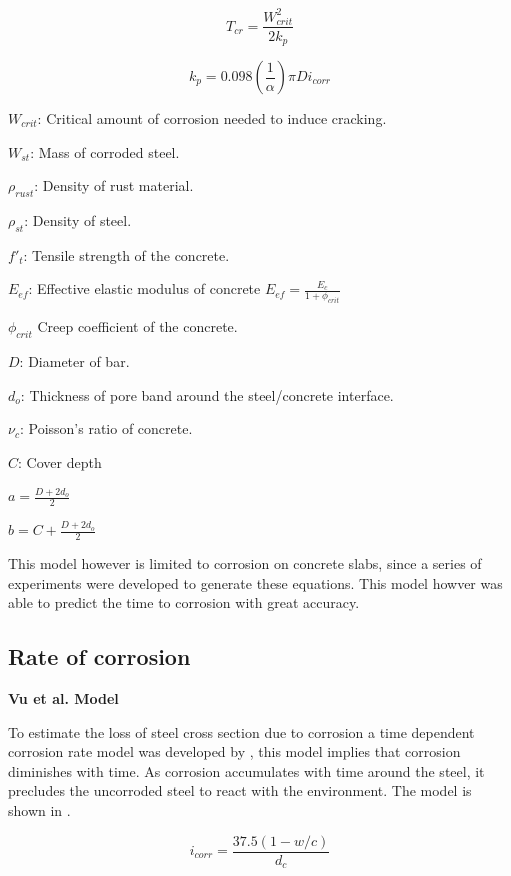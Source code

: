 \begin{equation}
  T_{cr}=\frac{W_{crit}^2}{2k_p}
  \label{eq.five}
\end{equation} 

\begin{equation}
  k_p=0.098 (\frac{1}{\alpha})\pi Di_{corr}
  \label{eq.six}
\end{equation} 

$W_{crit}$: Critical amount of corrosion needed to induce cracking.

$W_{st}$: Mass of corroded steel.

$\rho_{rust}$: Density of rust material.

$\rho_{st}$: Density of steel.

$f'_t$: Tensile strength of the concrete. 

$E_{ef}$: Effective elastic modulus of concrete $E_{ef}=\frac{E_c}{1+\phi_{crit}}$ 

$\phi_{crit}$ Creep coefficient of the concrete.

$D$: Diameter of bar.

$d_o$: Thickness of pore band around the steel/concrete interface.

$\nu_c$: Poisson's ratio of concrete.

$C$: Cover depth

$a=\frac{D+2d_o}{2}$

$b=C+\frac{D+2d_o}{2}$

This model however is limited to corrosion on concrete slabs, since a series of experiments were developed to generate these equations. This model howver was able to predict the time to corrosion with great accuracy.

\subsection{Rate of corrosion}

\textbf{Vu et al. Model }
\newline

To estimate the loss of steel cross section due to corrosion a time dependent corrosion rate model was developed by \cite{Vu2000}, this model implies that corrosion diminishes with time. As corrosion accumulates with time around the steel, it precludes the uncorroded steel to react with the environment. The model is shown in .

\begin{equation}
  i_{corr}=\frac{37.5(1-w/c)}{d_c}
  \label{eq.eight}
\end{equation} 

